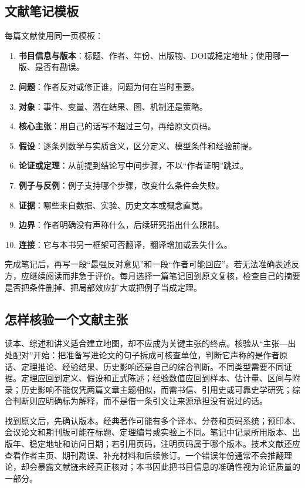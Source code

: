\subsection*{文献笔记模板}

每篇文献使用同一页模板：

\begin{enumerate}
  \item \textbf{书目信息与版本}：标题、作者、年份、出版物、DOI或稳定地址；使用哪一版、是否有勘误。
  \item \textbf{问题}：作者反对或修正谁，问题为何在当时重要。
  \item \textbf{对象}：事件、变量、潜在结果、图、机制还是策略。
  \item \textbf{核心主张}：用自己的话写不超过三句，再给原文页码。
  \item \textbf{假设}：逐条列数学与实质含义，区分定义、模型条件和经验前提。
  \item \textbf{论证或定理}：从前提到结论写中间步骤，不以“作者证明”跳过。
  \item \textbf{例子与反例}：例子支持哪个步骤，改变什么条件会失败。
  \item \textbf{证据}：哪些来自数据、实验、历史文本或概念直觉。
  \item \textbf{边界}：作者明确没有声称什么，后续研究指出什么限制。
  \item \textbf{连接}：它与本书另一框架可否翻译，翻译增加或丢失什么。
\end{enumerate}

完成笔记后，再写一段“最强反对意见”和一段“作者可能回应”。若无法准确表述反方，应继续阅读而非急于评价。每月选择一篇笔记回到原文复核，检查自己的摘要是否把条件删掉、把局部效应扩大或把例子当成定理。

\subsection*{怎样核验一个文献主张}

读本、综述和讲义适合建立地图，却不应成为关键主张的终点。核验从“主张---出处配对”开始：把准备写进论文的句子拆成可核查单位，判断它声称的是作者原话、定理推论、经验结果、历史影响还是自己的综合判断。不同类型需要不同证据。定理应回到定义、假设和正式陈述；经验数值应回到样本、估计量、区间与附录；历史影响不能仅凭两篇文章主题相似，而需书信、引用史或可靠史学研究；综合判断则应明确标为解释，而不是借一条引文让来源承担没有说过的话。

找到原文后，先确认版本。经典著作可能有多个译本、分卷和页码系统；预印本、会议论文和期刊版可能在标题、定理编号或实验上不同。笔记中记录所用版本、出版年、稳定地址和访问日期；若引用页码，注明页码属于哪个版本。技术文献还应查看作者主页、期刊勘误、补充材料和后续修订。一个错误年份通常不会推翻理论，却会暴露文献链未经真正核对；本书因此把书目信息的准确性视为论证质量的一部分。

